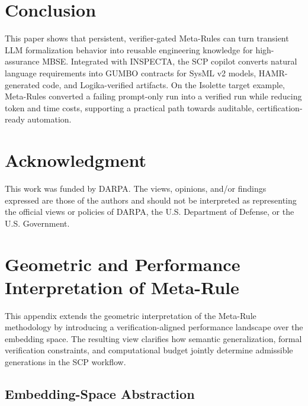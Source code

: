 \documentclass[conference]{IEEEtran}
\begin{document}
\section{Conclusion}
\label{sec:conclusion}

This paper shows that persistent, verifier-gated Meta-Rules can turn transient LLM formalization behavior into reusable engineering knowledge for high-assurance MBSE. Integrated with INSPECTA, the SCP copilot converts natural language requirements into GUMBO contracts for SysML v2 models, HAMR-generated code, and Logika-verified artifacts. On the Isolette target example, Meta-Rules converted a failing prompt-only run into a verified run while reducing token and time costs, supporting a practical path towards auditable, certification-ready automation.

\section*{Acknowledgment}
This work was funded by DARPA. The views, opinions, and/or findings expressed are those of the authors and should not be interpreted as representing the official views or policies of DARPA, the U.S. Department of Defense, or the U.S. Government.

\iffalse
\appendices
\appendices

\section{Geometric and Performance Interpretation of Meta-Rule }
\label{app:vsc}

This appendix extends the geometric interpretation of the Meta-Rule methodology by introducing a verification-aligned performance landscape over the embedding space. The resulting view clarifies how semantic generalization, formal verification constraints, and computational budget jointly determine admissible generations in the SCP workflow.

\subsection{Embedding-Space Abstraction}
\end{document}
